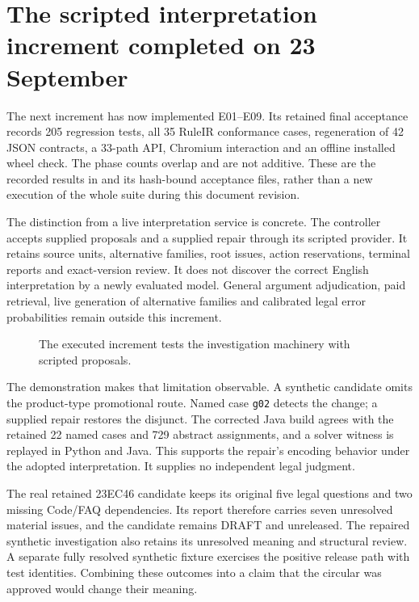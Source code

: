 \section{The scripted interpretation increment completed on 23 September}
\label{sec:executed-interpretation}

The next increment has now implemented E01--E09. Its retained final acceptance
records 205 regression tests, all 35 RuleIR conformance cases, regeneration of
42 JSON contracts, a 33-path API, Chromium interaction and an offline installed
wheel check. The phase counts overlap and are not additive. These are the
recorded results in
 and its
hash-bound acceptance files, rather than a new execution of the whole suite
during this document revision.

The distinction from a live interpretation service is concrete. The controller
accepts supplied proposals and a supplied repair through its scripted provider.
It retains source units, alternative families, root issues, action reservations,
terminal reports and exact-version review. It does not discover the correct
English interpretation by a newly evaluated model. General argument adjudication,
paid retrieval, live generation of alternative families and calibrated legal
error probabilities remain outside this increment.

\begin{figure}[H]
\centering
{}
\caption{The executed increment tests the investigation machinery with scripted proposals.}
\label{fig:executed-scripted-increment}
\end{figure}

The demonstration makes that limitation observable. A synthetic candidate omits
the product-type promotional route. Named case \texttt{g02} detects the change;
a supplied repair restores the disjunct. The corrected Java build agrees with
the retained 22 named cases and 729 abstract assignments, and a solver witness
is replayed in Python and Java. This supports the repair's encoding behavior
under the adopted interpretation. It supplies no independent legal judgment.

The real retained 23EC46 candidate keeps its original five legal questions and
two missing Code/FAQ dependencies. Its report therefore carries seven unresolved
material issues, and the candidate remains DRAFT and unreleased. The repaired
synthetic investigation also retains its unresolved meaning and structural
review. A separate fully resolved synthetic fixture exercises the positive
release path with test identities. Combining these outcomes into a claim that
the circular was approved would change their meaning.

